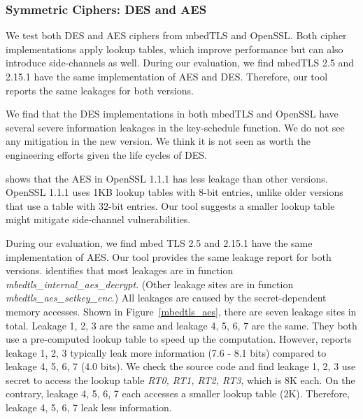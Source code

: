 \subsubsection{Symmetric Ciphers: DES and AES}\label{eval:sym}
We test both DES and AES ciphers from mbedTLS and OpenSSL\@. Both cipher implementations apply lookup tables, which improve performance but can also introduce side-channels as well. During our evaluation, we find mbedTLS 2.5 and 2.15.1 have the same implementation of AES and DES\@. Therefore, our tool reports the same leakages for both versions.

We find that the DES implementations in both mbedTLS and OpenSSL have several severe information leakages in the key-schedule function. We do not see any mitigation
in the new version. We think it is not seen as worth the engineering efforts given the life cycles of DES\@.

\tool{} shows that the AES in OpenSSL 1.1.1 has less leakage than other versions.
OpenSSL 1.1.1 uses 1KB lookup tables with 8-bit entries, unlike older versions that use a table with 32-bit entries. Our tool suggests a smaller lookup table might mitigate side-channel vulnerabilities.

During our evaluation, we find mbed TLS 2.5 and 2.15.1 have the same
implementation of AES\@. Our tool provides the same leakage report for both
versions. \tool{} identifies that most leakages are in function
\emph{mbedtls\_internal\_aes\_decrypt}. (Other leakage sites are in function
\emph{mbedtls\_aes\_setkey\_enc}.) All leakages are caused by the secret-dependent
memory accesses. Shown in Figure~\ref{mbedtls_aes}, there are seven leakage
sites in total. Leakage 1, 2, 3 are the same and leakage 4, 5, 6, 7 are the
same. They both use a pre-computed lookup table to speed up the computation.
However, \tool{} reports leakage 1, 2, 3 typically leak more information (7.6 - 8.1 bits)
compared to leakage 4, 5, 6, 7 (4.0 bits). We check the source code and find leakage 1, 2,
3 use secret to access the lookup table \emph{RT0, RT1, RT2, RT3}, which is 8K
each. On the contrary, leakage 4, 5, 6, 7 each accesses a smaller lookup table
(2K). Therefore, leakage 4, 5, 6, 7 leak less information.

